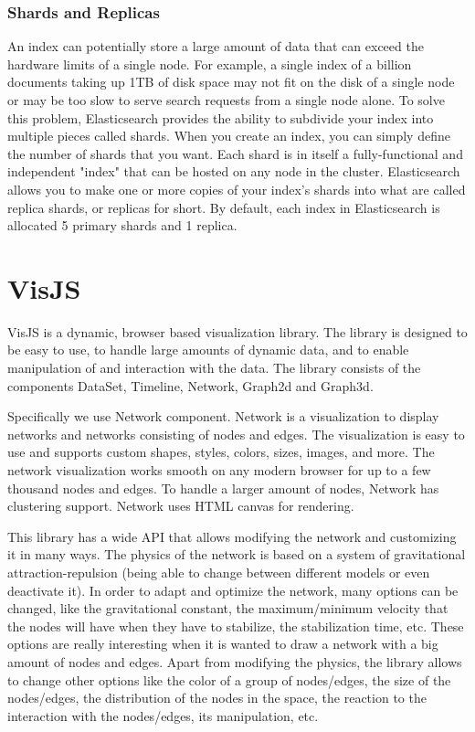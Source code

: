 \documentclass[a4paper, 12pt]{book}
\begin{document}
\subsubsection{Shards and Replicas}
An index can potentially store a large amount of data that can exceed the hardware limits of a single node. For example, a single index of a billion documents taking up 1TB of disk space may not fit on the disk of a single node or may be too slow to serve search requests from a single node alone. To solve this problem, Elasticsearch provides the ability to subdivide your index into multiple pieces called shards. When you create an index, you can simply define the number of shards that you want. Each shard is in itself a fully-functional and independent "index" that can be hosted on any node in the cluster.
Elasticsearch allows you to make one or more copies of your index’s shards into what are called replica shards, or replicas for short. By default, each index in Elasticsearch is allocated 5 primary shards and 1 replica.

\section{VisJS}
\label{sec:visjs}
VisJS is a dynamic, browser based visualization library. The library is designed to be easy to use, to handle large amounts of dynamic data, and to enable manipulation of and interaction with the data. The library consists of the components DataSet, Timeline, Network, Graph2d and Graph3d.

Specifically we use Network component. Network is a visualization to display networks and networks consisting of nodes and edges. The visualization is easy to use and supports custom shapes, styles, colors, sizes, images, and more. The network visualization works smooth on any modern browser for up to a few thousand nodes and edges. To handle a larger amount of nodes, Network has clustering support. Network uses HTML canvas for rendering.

This library has a wide API that allows modifying the network and customizing it in many ways. The physics of the network is based on a system of gravitational attraction-repulsion (being able to change between different models or even deactivate it). In order to adapt and optimize the network, many options can be changed, like the gravitational constant, the maximum/minimum velocity that the nodes will have when they have to stabilize, the stabilization time, etc. These options are really interesting when it is wanted to draw a network with a big amount of nodes and edges. Apart from modifying the physics, the library allows to change other options like the color of a group of nodes/edges, the size of the nodes/edges, the distribution of the nodes in the space, the reaction to the interaction with the nodes/edges, its manipulation, etc.
\end{document}
